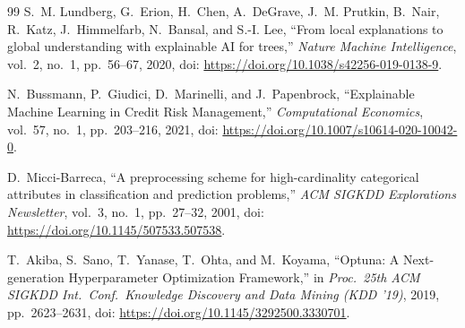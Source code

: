 {\begin{thebibliography}{99}
S.~M. Lundberg, G.~Erion, H.~Chen, A.~DeGrave, J.~M. Prutkin, B.~Nair, R.~Katz, J.~Himmelfarb, N.~Bansal, and S.-I. Lee, ``From local explanations to global understanding with explainable AI for trees,'' \textit{Nature Machine Intelligence}, vol.~2, no.~1, pp.~56--67, 2020, doi: \url{https://doi.org/10.1038/s42256-019-0138-9}.

N.~Bussmann, P.~Giudici, D.~Marinelli, and J.~Papenbrock, ``Explainable Machine Learning in Credit Risk Management,'' \textit{Computational Economics}, vol.~57, no.~1, pp.~203--216, 2021, doi: \url{https://doi.org/10.1007/s10614-020-10042-0}.

D.~Micci-Barreca, ``A preprocessing scheme for high-cardinality categorical attributes in classification and prediction problems,'' \textit{ACM SIGKDD Explorations Newsletter}, vol.~3, no.~1, pp.~27--32, 2001, doi: \url{https://doi.org/10.1145/507533.507538}.

T.~Akiba, S.~Sano, T.~Yanase, T.~Ohta, and M.~Koyama, ``Optuna: A Next-generation Hyperparameter Optimization Framework,'' in \textit{Proc.\ 25th ACM SIGKDD Int.\ Conf.\ Knowledge Discovery and Data Mining (KDD '19)}, 2019, pp.~2623--2631, doi: \url{https://doi.org/10.1145/3292500.3330701}.

\end{thebibliography}
}
